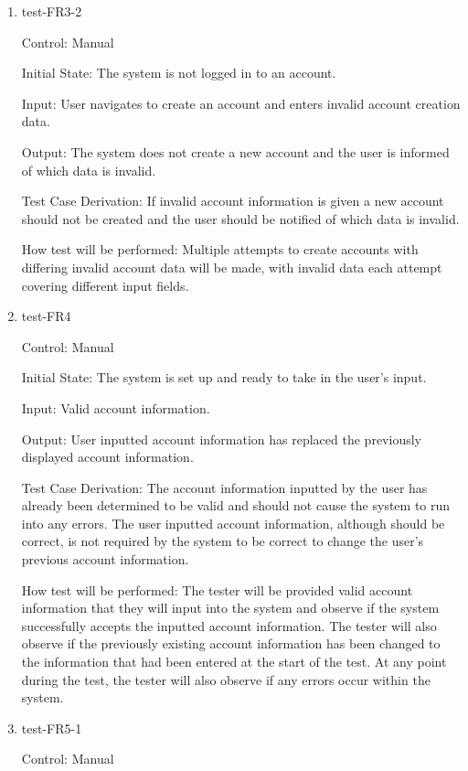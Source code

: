 \documentclass[12pt, titlepage]{article}
\begin{document}
\begin{enumerate}
  \item{test-FR3-2\\}

  Control: Manual

  Initial State: The system is not logged in to an account.

  Input: User navigates to create an account and enters invalid account
  creation data.

  Output: The system does not create a new account and the user is informed of
  which data is invalid.

  Test Case Derivation: If invalid account information is given a new account
  should not be created and the user should be notified of which data is
  invalid.

  How test will be performed: Multiple attempts to create accounts with
  differing invalid account data will be made, with invalid data each attempt
  covering different input fields.

  \item{test-FR4\\}

  Control: Manual

  Initial State: The system is set up and ready to take in the user's input.

  Input: Valid account information.

  Output: User inputted account information has replaced the previously displayed
  account information.

  Test Case Derivation: The account information inputted by the user has already been
  determined to be valid and should not cause the system to run into any errors. The
  user inputted account information, although should be correct, is not required by
  the system to be correct to change the user's previous account information.

  How test will be performed: The tester will be provided valid account information
  that they will input into the system and observe if the system successfully
  accepts the inputted account information. The tester will also observe if the previously
  existing account information has been changed to the information that had been entered
  at the start of the test. At any point during the test, the tester will also observe if
  any errors occur within the system.

  \item{test-FR5-1\\}

  Control: Manual


\end{enumerate}
\end{document}
